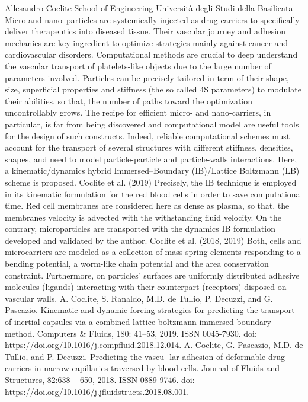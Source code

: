 \documentclass{article}
\begin{document}
{Allesandro Coclite}
{School of Engineering Università degli Studi della Basilicata}
{Micro and nano–particles are systemically injected as drug carriers to specifically
deliver therapeutics into diseased tissue. Their vascular journey and adhesion mechanics
are key ingredient to optimize strategies mainly against cancer and cardiovascular
disorders. Computational methods are crucial to deep understand the vascular transport of
platelets-like objects due to the large number of parameters involved. Particles can be
precisely tailored in term of their shape, size, superficial properties and stiffness
(the so called 4S parameters) to modulate their abilities, so that, the number of paths
toward the optimization uncontrollably grows. The recipe for efficient micro- and
nano-carriers, in particular, is far from being discovered and computational model are
useful tools for the design of such constructs. Indeed, reliable computational schemes
must account for the transport of several structures with different stiffness, densities,
shapes, and need to model particle-particle and particle-walls interactions.  Here, a
kinematic/dynamics hybrid Immersed–Boundary (IB)/Lattice Boltzmann (LB) scheme is
proposed. Coclite et al. (2019) Precisely, the IB technique is employed in its kinematic
formulation for the red blood cells in order to save computational time. Red cell
membranes are considered here as dense as plasma, so that, the membranes velocity is
advected with the withstanding fluid velocity. On the contrary, microparticles are
transported with the dynamics IB formulation developed and validated by the author.
Coclite et al. (2018, 2019) Both, cells and microcarriers are modeled as a collection of
mass-spring elements responding to a bending potential, a worm-like chain potential and
the area conservation constraint. Furthermore, on particles’ surfaces are uniformly
distributed adhesive molecules (ligands) interacting with their counterpart (receptors)
disposed on vascular walls.\newline\newline
\small{A. Coclite, S. Ranaldo, M.D. de Tullio, P. Decuzzi, and G. Pascazio. Kinematic
and dynamic forcing strategies for predicting the transport of inertial capsules via a
combined lattice boltzmann immersed boundary method. Computers & Fluids, 180:
41–53, 2019. ISSN 0045-7930. doi: https://doi.org/10.1016/j.compfluid.2018.12.014.\newline
A. Coclite, G. Pascazio, M.D. de Tullio, and P. Decuzzi. Predicting the vascu-
lar adhesion of deformable drug carriers in narrow capillaries traversed by blood
cells. Journal of Fluids and Structures, 82:638 – 650, 2018. ISSN 0889-9746. doi:
https://doi.org/10.1016/j.jfluidstructs.2018.08.001.}}
\end{document}
